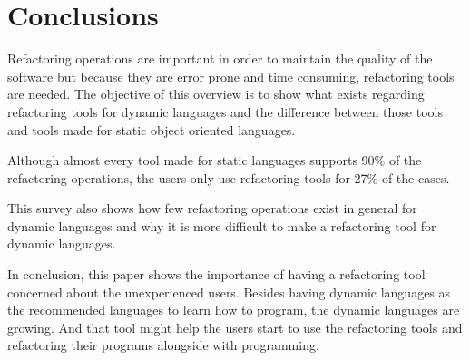 
% 
% 

\section{Conclusions}



Refactoring operations are important in order to maintain the quality of the software but because they are error prone and time consuming, refactoring tools are needed.
The objective of this overview is to show what exists regarding refactoring tools for dynamic languages and the difference between those tools and tools made for static object oriented languages.


Although almost every tool made for static languages supports 90\% of the refactoring operations, the users only use refactoring tools for 27\% of the cases. %

This survey also shows how few refactoring operations exist in general for dynamic languages and why it is more difficult to make a refactoring tool for dynamic languages.

In conclusion, this paper shows the importance of having a refactoring tool concerned about the unexperienced users. 
Besides having dynamic languages as the recommended languages to learn how to program, the dynamic languages are growing. 
And that tool might help the users start to use the refactoring tools and refactoring their programs alongside with programming.

